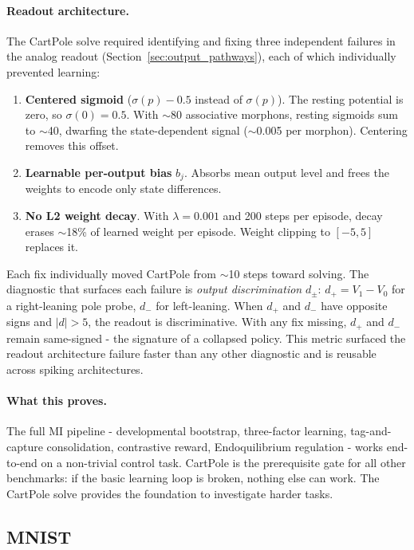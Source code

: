 \paragraph{Readout architecture.}
\label{sec:readout_engineering}
The CartPole solve required identifying and fixing three independent failures in the analog readout (Section~\ref{sec:output_pathways}), each of which individually prevented learning:

\begin{enumerate}
  \item \textbf{Centered sigmoid} ($\sigma(p) - 0.5$ instead of $\sigma(p)$). The resting potential is zero, so $\sigma(0) = 0.5$. With $\sim$80 associative morphons, resting sigmoids sum to $\sim$40, dwarfing the state-dependent signal ($\sim$0.005 per morphon). Centering removes this offset.
  \item \textbf{Learnable per-output bias} $b_j$. Absorbs mean output level and frees the weights to encode only state differences.
  \item \textbf{No L2 weight decay}. With $\lambda = 0.001$ and 200 steps per episode, decay erases $\sim$18\% of learned weight per episode. Weight clipping to $[-5, 5]$ replaces it.
\end{enumerate}

Each fix individually moved CartPole from $\sim$10 steps toward solving. The diagnostic that surfaces each failure is \emph{output discrimination} $d_\pm$: $d_+ = V_1 - V_0$ for a right-leaning pole probe, $d_-$ for left-leaning. When $d_+$ and $d_-$ have opposite signs and $|d| > 5$, the readout is discriminative. With any fix missing, $d_+$ and $d_-$ remain same-signed - the signature of a collapsed policy. This metric surfaced the readout architecture failure faster than any other diagnostic and is reusable across spiking architectures.

\paragraph{What this proves.}
The full MI pipeline - developmental bootstrap, three-factor learning, tag-and-capture consolidation, contrastive reward, Endoquilibrium regulation - works end-to-end on a non-trivial control task. CartPole is the prerequisite gate for all other benchmarks: if the basic learning loop is broken, nothing else can work. The CartPole solve provides the foundation to investigate harder tasks.

\subsection{MNIST}
\label{sec:exp_mnist}

